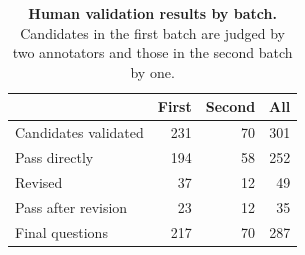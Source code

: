 \begin{table}[t]
\centering
\small
\caption{\textbf{Human validation results by batch.}
Candidates in the first batch are judged by two annotators and those in the second batch by one.}
\label{tab:human_validation}
\begin{tabular}{@{}lrrr@{}}
\toprule
 & \textbf{First} & \textbf{Second} & \textbf{All} \\
\midrule
Candidates validated         & 231 & 70 & 301 \\
\quad Pass directly          & 194 & 58 & 252 \\
\quad Revised                & 37  & 12 & 49  \\
\quad Pass after revision    & 23  & 12 & 35  \\
\midrule
Final questions              & 217 & 70 & 287 \\
\bottomrule
\end{tabular}
\end{table}
